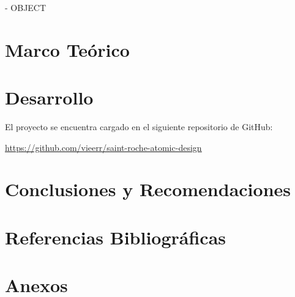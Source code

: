 \documentclass[12pt,letterpaper]{article}
\begin{document}
- OBJECT


\section{Marco Teórico}



\section{Desarrollo}

El proyecto se encuentra cargado en el siguiente repositorio de GitHub: 

\href{https://github.com/vieerr/saint-roche-atomic-design}{\color{blue}\underline{https://github.com/vieerr/saint-roche-atomic-design}}









\section{Conclusiones y Recomendaciones}



\section{Referencias Bibliográficas}
\printbibliography[heading=none]


\section{Anexos}
\end{document}
